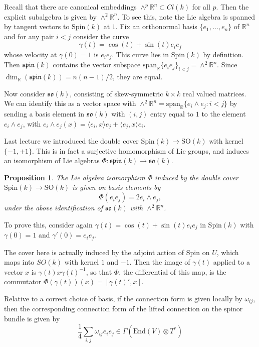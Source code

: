 \documentclass[11pt, reqno]{article}
\theoremstyle{plain}
\newtheorem*{proposition}{Proposition}
\theoremstyle{definition}
\theoremstyle{remark}
\newcommand{\RR}{\mathbb{R}}
\begin{document}
Recall that there are canonical embeddings $\wedge^p\RR^n \subset Cl(k)$ for all $p$.
Then the explicit subalgebra is given by $\wedge^2 \RR^n$. To see this, note the Lie algebra is 
spanned by tangent vectors to $\text{Spin}(k)$ at $1$. Fix an orthonormal basis $\{e_1, \dots, e_n\}$ of $\RR^n$
and for any pair $i < j$ consider the curve
\[
    \gamma(t) = \cos(t) + \sin(t)e_i e_j
\]
whose velocity at $\gamma(0) = 1$ is $e_i e_j$. This curve lies in $\text{Spin}(k)$ by definition. Then $\mathfrak{spin}(k)$ 
contains the vector subspace $\text{span}_\RR\{e_i e_j\}_{i < j} = \wedge^2 \RR^n$. Since $\dim_\RR(\mathfrak{spin}(k)) = n(n-1)/2$, 
they are equal. 

Now consider $\mathfrak{so}(k)$, consisting of skew-symmetric $k\times k$ real valued matrices. We can identify this
as a vector space with $\wedge^2 \RR^n = \text{span}_\RR\{e_i \wedge e_j: i < j\}$ by sending 
a basis element in $\mathfrak{so}(k)$ with $(i,j)$ entry equal to $1$ to the element $e_i \wedge e_j$,
with $e_i \wedge e_j(x) = \langle e_i,x\rangle e_j + \langle e_j, x\rangle e_i$. 

Last lecture we introduced the double cover $\text{Spin}(k) \to \text{SO}(k)$ with kernel $\{-1,+1\}$. This is 
in fact a surjective homomorphism of Lie groups, and induces an isomorphism of Lie algebras 
$\Phi: \mathfrak{spin}(k) \to \mathfrak{so}(k)$.

\begin{proposition}
    The Lie algebra isomorphism $\Phi$ induced by the double cover $\text{Spin}(k) \to \text{SO}(k)$ 
    is given on basis elements by
    \[
        \Phi(e_i e_j) = 2 e_i \wedge e_j,
    \]
    under the above identification of $\mathfrak{so}(k)$ with $\wedge^2\RR^n$. 
\end{proposition}

To prove this, consider again $\gamma(t) = \cos(t) + \sin(t)e_i e_j$ in $\text{Spin}(k)$ with $\gamma(0) = 1$
and $\gamma'(0) = e_i e_j$. 

The cover here is actually induced by the adjoint action of Spin on $U$, which maps into $SO(k)$ with kernel $1$ and $-1$. Then 
the image of $\gamma(t)$ applied to a vector $x$ is $\gamma(t) x \gamma(t)^{-1}$, so that $\Phi$, the differential
of this map, is the commutator $\Phi(\gamma(t))(x) = [\gamma(t)', x]$.

Relative to a correct choice of basis, if the connection form is given locally by $\omega_{ij}$, then the corresponding 
connection form of the lifted connection on the spinor bundle is given by
\[
    \frac{1}{4}\sum_{i,j}\omega_{ij}e_i e_j \in \Gamma(\text{End}(V)\otimes T^*)
\]
\end{document}
